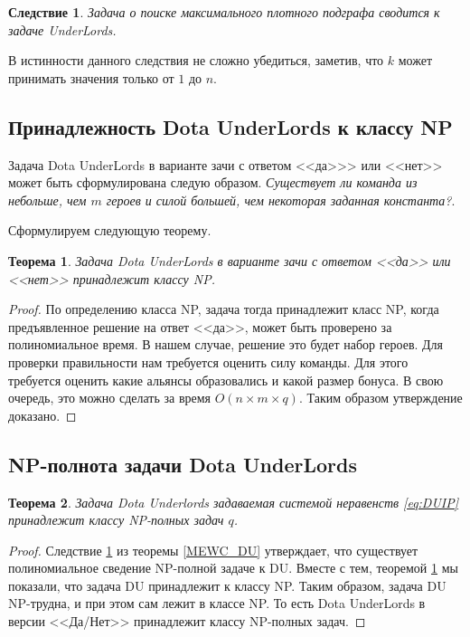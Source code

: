 \documentclass{article}
\newtheorem{theorem}{Теорема}
\newtheorem{corollary}{Следствие}
\begin{document}
\begin{corollary}
    Задача о поиске максимального плотного подграфа сводится к задаче UnderLords.
    \label{MEWC_DU_cor}
\end{corollary}
В истинности данного следствия не сложно убедиться, заметив, что $k$ может принимать значения только от $1$ до $n$. 

\subsection{Принадлежность Dota UnderLords к классу NP}
Задача Dota UnderLords в варианте зачи с ответом <<да>>> или <<нет>>  может быть сформулирована следую образом. \textit{Существует ли команда из небольше, чем $m$ героев и силой большей, чем некоторая заданная константа?}.

Сформулируем следующую теорему.
\begin{theorem}
\label{DU_is_NP}
Задача Dota UnderLords в варианте зачи с ответом <<да>> или <<нет>>  принадлежит классу NP.
\end{theorem}
\begin{proof}
По определению класса NP, задача тогда принадлежит класс NP, когда предъявленное решение на ответ <<да>>, может быть проверено за полиномиальное время. В нашем случае, решение это будет набор героев. Для проверки правильности нам требуется оценить силу команды. Для этого требуется оценить какие альянсы образовались и какой размер бонуса. В свою очередь, это можно сделать за время $O(n \times m  \times  q)$. Таким образом утверждение доказано.
\end{proof}

\subsection{NP-полнота задачи Dota UnderLords}

\begin{theorem}
    Задача Dota Underlords задаваемая системой неравенств \eqref{eq:DUIP} принадлежит классу NP-полных задач $q$.
\end{theorem}

\begin{proof}
	Следствие \ref{MEWC_DU_cor} из теоремы \ref{MEWC_DU} утверждает, что существует полиномиальное сведение NP-полной задаче к DU. Вместе с тем, теоремой \ref{DU_is_NP} мы показали, что задача DU принадлежит к классу NP. Таким образом, задача DU NP-трудна, и при этом сам лежит в классе NP. То есть Dota UnderLords в версии <<Да/Нет>> принадлежит классу NP-полных задач. 
\end{proof}
\end{document}
